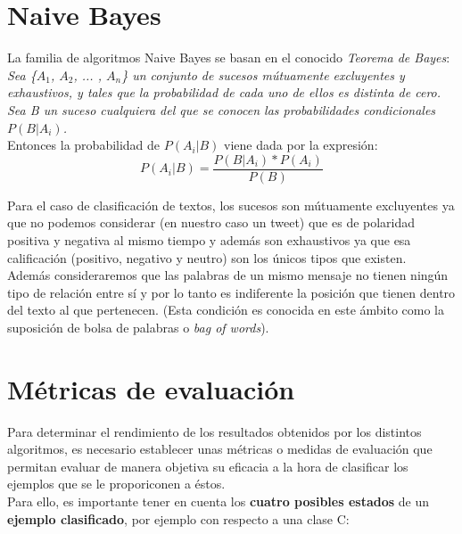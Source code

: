 \documentclass[a4paper,12pt]{report}
\begin{document}
\section{Naive Bayes}

{\setlength{\parindent}{0cm}
La familia de algoritmos Naive Bayes se basan en el conocido \textit{Teorema de Bayes}:} \\

{\setlength{\parindent}{0cm}
\textit{Sea \{$A_1$, $A_2$, ... , $A_n$\} un conjunto de sucesos mútuamente excluyentes y exhaustivos, y tales que la probabilidad de cada uno de ellos es distinta de cero. Sea B un suceso cualquiera del que se conocen las probabilidades condicionales $P(B|A_i)$.}
\vspace{2mm}\\
Entonces la probabilidad de $P(A_i |B)$ viene dada por la expresión:}
\vspace{4mm}
\[ P(A_i | B) = \frac{P(B|A_i) * P(A_i)}{P(B)}  \]

\vspace{4mm}
{\setlength{\parindent}{0cm}
Para el caso de clasificación de textos, los sucesos son mútuamente excluyentes ya que no podemos considerar (en nuestro caso un tweet) que es de polaridad positiva y negativa al mismo tiempo y además son exhaustivos ya que esa calificación (positivo, negativo y neutro) son los únicos tipos que existen.}
\vspace{2mm}\\
Además consideraremos que las palabras de un mismo mensaje no tienen ningún tipo de relación entre sí y por lo tanto es indiferente la posición que tienen dentro del texto al que pertenecen. (Esta condición es conocida en este ámbito como la suposición de bolsa de palabras o \textit{bag of words}). 
\vspace{4mm}


\section{Métricas de evaluación}

{\setlength{\parindent}{0cm}
Para determinar el rendimiento de los resultados obtenidos por los distintos algoritmos, es necesario establecer unas métricas o medidas de evaluación que permitan evaluar de manera objetiva su eficacia a la hora de clasificar los ejemplos que se le proporiconen a éstos.}
\vspace{4mm}\\
Para ello, es importante tener en cuenta los \textbf{cuatro posibles estados} de un \textbf{ejemplo clasificado}, por ejemplo con respecto a una clase C:
\end{document}
